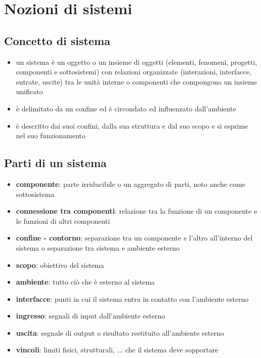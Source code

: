 \newpage

\section{Nozioni di sistemi}
\subsection{Concetto di sistema}
\begin{itemize}
	\item un sistema è un oggetto o un insieme di oggetti (elementi, fenomeni, progetti, componenti e sottosistemi) con relazioni
	organizzate (interazioni, interfacce, entrate, uscite) tra le unità interne o componenti che compongono un insieme unificato
	\item è delimitato da un confine ed è circondato ed influenzato dall'ambiente
	\item è descritto dai suoi confini, dalla sua struttura e dal suo scopo e si esprime nel suo funzionamento
\end{itemize}

\subsection{Parti di un sistema}
\begin{itemize}
	\item \textbf{componente}: parte irriducibile o un aggregato di parti, noto anche come sottosistema
	\item \textbf{connessione tra componenti}: relazione tra la funzione di un componente e le funzioni di altri componenti
	\item \textbf{confine - contorno}: separazione tra un componente e l'altro all'interno del sistema o separazione tra sistema
	e ambiente esterno
	\item \textbf{scopo}: obiettivo del sistema
	\item \textbf{ambiente}: tutto ciò che è esterno al sistema
	\item \textbf{interfacce}: punti in cui il sistema entra in contatto con l'ambiente esterno
	\item \textbf{ingresso}: segnali di input dall'ambiente esterno
	\item \textbf{uscita}: segnale di output o risultato restituito all'ambiente esterno
	\item \textbf{vincoli}: limiti fisici, strutturali, ... che il sistema deve sopportare
\end{itemize}

